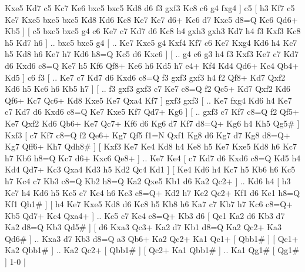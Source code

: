 Kxe5 Kd7  c5 Kc7  Ke6 bxc5  bxc5 Kd8  d6 f3  gxf3 Kc8  c6 g4  fxg4   ]  c5 [  h3 Kf7  c5 Ke7  Kxe5 bxc5  bxc5 Kd8  Kd6 Kc8  Ke7 Kc7  d6+ Kc6  d7 Kxc5  d8=Q Kc6  Qd6+ Kb5   ]  [  c5 bxc5  bxc5 g4  c6 Ke7  c7 Kd7  d6 Kc8  h4 gxh3  gxh3 Kd7  h4 f3  Kxf3 Kc8  h5 Kd7  h6   ] .. bxc5    bxc5   g4 [ .. Ke7  Kxe5 g4  Kxf4 Kf7  c6 Ke7  Kxg4 Kd6  h4 Kc7  h5 Kd8  h6 Ke7  h7 Kd6  h8=Q Kc5  d6 Kxc6   ]  [ .. g4  c6 g3  h4 f3  Kxf3 Ke7  c7 Kd7  d6 Kxd6  c8=Q Ke7  h5 Kf6  Qf8+ Ke6  h6 Kd5  h7 e4+  Kf4 Kd4  Qd6+ Kc4  Qb4+ Kd5   ]  c6   f3 [ .. Ke7  c7 Kd7  d6 Kxd6  c8=Q f3  gxf3 gxf3  h4 f2  Qf8+ Kd7  Qxf2 Kd6  h5 Kc6  h6 Kb5  h7   ]  [ .. f3  gxf3 gxf3  c7 Ke7  c8=Q f2  Qc5+ Kd7  Qxf2 Kd6  Qf6+ Kc7  Qc6+ Kd8  Kxe5 Ke7  Qxa4 Kf7   ]  gxf3   gxf3 [ .. Ke7  fxg4 Kd6  h4 Ke7  c7 Kd7  d6 Kxd6  c8=Q Ke7  Kxe5 Kf7  Qd7+ Kg6   ]  [ .. gxf3  c7 Kf7  c8=Q f2  Qf5+ Ke7  Qxf2 Kd6  Qb6+ Ke7  Qc7+ Kf6  d6 Kg6  d7 Kf7  d8=Q+ Kg6  h4 Kh5  Qg5#   ]  Kxf3 [  c7 Kf7  c8=Q f2  Qe6+ Kg7  Qf5 f1=N  Qxf1 Kg8  d6 Kg7  d7 Kg8  d8=Q+ Kg7  Qff6+ Kh7  Qdh8#   ]  [  Kxf3 Ke7  Ke4 Kd8  h4 Ke8  h5 Ke7  Kxe5 Kd8  h6 Kc7  h7 Kb6  h8=Q Kc7  d6+ Kxc6  Qe8+   ] .. Ke7    Ke4 [  c7 Kd7  d6 Kxd6  c8=Q Kd5  h4 Kd4  Qd7+ Kc3  Qxa4 Kd3  h5 Kd2  Qc4 Kd1   ]  [  Ke4 Kd6  h4 Kc7  h5 Kb6  h6 Kc5  h7 Kc4  c7 Kb3  c8=Q Kb2  h8=Q Ka2  Qxe5 Kb1  d6 Ka2  Qc2+   ] .. Kd6    h4 [  h3 Kc7  h4 Kd6  h5 Kc5  c7 Kc4  h6 Kc3  c8=Q+ Kd2  h7 Ke2  Qc2+ Kf1  d6 Ke1  h8=Q Kf1  Qh1#   ]  [  h4 Ke7  Kxe5 Kd8  d6 Kc8  h5 Kb8  h6 Ka7  c7 Kb7  h7 Kc6  c8=Q+ Kb5  Qd7+ Kc4  Qxa4+   ] .. Kc5    c7   Kc4    c8=Q+   Kb3    d6 [  Qc1 Ka2  d6 Kb3  d7 Ka2  d8=Q Kb3  Qd5#   ]  [  d6 Kxa3  Qc3+ Ka2  d7 Kb1  d8=Q Ka2  Qc2+ Ka3  Qd6#   ] .. Kxa3    d7   Kb3    d8=Q   a3    Qb6+   Ka2    Qc2+   Ka1   Qc1+ [  Qbb1#   ]  [  Qc1+ Ka2  Qbb1#   ] .. Ka2   Qc2+ [  Qbb1#   ]  [  Qc2+ Ka1  Qbb1#   ] .. Ka1   Qg1#    [  Qg1#   ] 1-0  |
